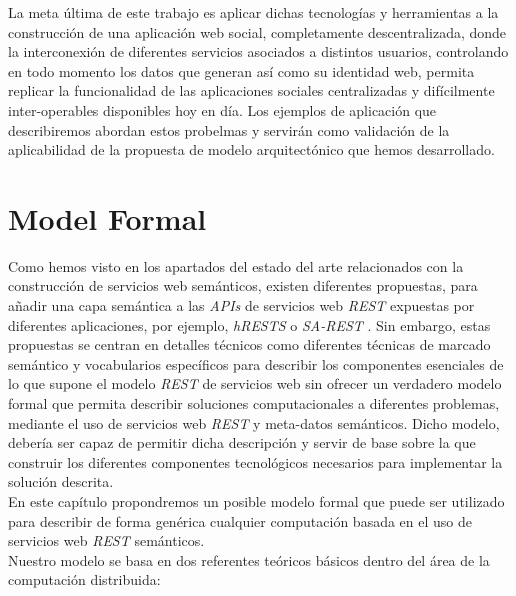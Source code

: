 La meta \'ultima de este trabajo es aplicar dichas tecnolog\'ias y herramientas a la construcci\'on de una aplicaci\'on web social, completamente descentralizada, donde la interconexi\'on de diferentes servicios asociados a distintos usuarios, controlando en todo momento los datos que generan as\'i como su identidad web, permita replicar la funcionalidad de las aplicaciones sociales centralizadas y dif\'icilmente inter-operables disponibles hoy en d\'ia. Los ejemplos de aplicaci\'on que describiremos abordan estos probelmas y servir\'an como validaci\'on de la aplicabilidad de la propuesta de modelo arquitect\'onico que hemos desarrollado.

\section{Model Formal}

Como hemos visto en los apartados del estado del arte relacionados con la construcci\'on de servicios web sem\'anticos, existen diferentes propuestas, para a\~nadir una capa sem\'antica a las \textit{APIs} de servicios web \textit{REST} expuestas por diferentes aplicaciones, por ejemplo, \textit{hRESTS} \cite{hrests} o \textit{SA-REST} \cite{sarest}. Sin embargo, estas propuestas se centran en detalles t\'ecnicos como diferentes t\'ecnicas de marcado sem\'antico y vocabularios espec\'ificos para describir los componentes esenciales de lo que supone el modelo \textit{REST} de servicios web sin ofrecer un verdadero modelo formal que permita describir soluciones computacionales a diferentes problemas, mediante el uso de servicios web \textit{REST} y meta-datos sem\'anticos. Dicho modelo, deber\'ia ser capaz de permitir dicha descripci\'on y servir de base sobre la que construir los diferentes componentes tecnol\'ogicos necesarios para implementar la soluci\'on descrita.\\
En este cap\'itulo propondremos un posible modelo formal que puede ser utilizado para describir de forma gen\'erica cualquier computaci\'on basada en el uso de servicios web \textit{REST} sem\'anticos.\\
Nuestro modelo se basa en dos referentes te\'oricos b\'asicos dentro del \'area de la computaci\'on distribuida:

